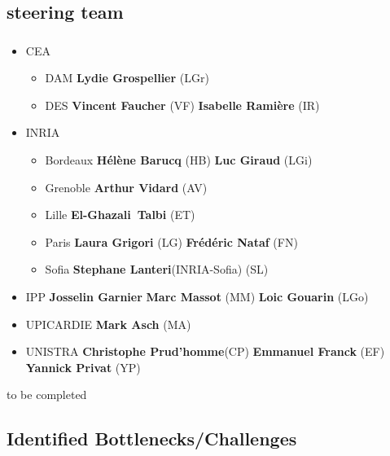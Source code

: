 \subsection{steering team}
\begin{frame}
  \frametitle{\insertsectionhead}
  \framesubtitle{\insertsubsectionhead}
\scriptsize
  \begin{itemize}
    \item CEA 
    \begin{itemize}
      \item DAM \textbf{Lydie Grospellier} (LGr)
      \item DES \textbf{Vincent Faucher} (VF) \textbf{Isabelle Ramière} (IR)  
    \end{itemize}
    \item INRIA 
    \begin{itemize}
      \item Bordeaux \textbf{Hélène Barucq} (HB) \textbf{Luc Giraud} (LGi)
      \item  Grenoble \textbf{Arthur Vidard} (AV)
      \item Lille \textbf{El-Ghazali Talbi} (ET) 
      \item Paris \textbf{Laura Grigori} (LG) \textbf{Frédéric Nataf} (FN)
      \item Sofia \textbf{Stephane Lanteri}(INRIA-Sofia) (SL) 
    \end{itemize}
    \item IPP \textbf{Josselin Garnier} \textbf{Marc Massot} (MM) \textbf{Loic Gouarin} (LGo)
    \item UPICARDIE \textbf{Mark Asch} (MA)
    \item UNISTRA \textbf{Christophe Prud'homme}(CP) \textbf{Emmanuel Franck} (EF) \textbf{Yannick Privat} (YP)
  \end{itemize}
  \alert{to be completed}
\end{frame}

\subsection{Identified Bottlenecks/Challenges}

